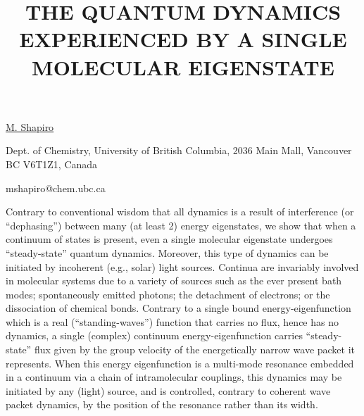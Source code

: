 \title{THE QUANTUM DYNAMICS EXPERIENCED BY A SINGLE MOLECULAR EIGENSTATE}

\underline{M. Shapiro} 

{\normalsize{\vspace{-4mm}}
Dept. of Chemistry,
University of British Columbia,
2036 Main Mall,
Vancouver BC V6T1Z1,
Canada

\email mshapiro@chem.ubc.ca}

Contrary to conventional wisdom that all dynamics is a result of interference (or ``dephasing'')
between many (at least 2) energy eigenstates, we show that when a continuum of states
is present, even a single molecular eigenstate undergoes ``steady-state'' quantum dynamics.
Moreover, this type of dynamics can be initiated by incoherent (e.g., solar) light sources.
Continua are invariably involved in molecular systems due to a variety of sources such as the
ever present bath modes; spontaneously emitted photons; the detachment of electrons; or
the dissociation of chemical bonds. Contrary to a single bound energy-eigenfunction which
is a real (``standing-waves'') function that carries no flux, hence has no dynamics, a single
(complex) continuum energy-eigenfunction carries ``steady-state'' flux given by the group velocity
of the energetically narrow wave packet it represents. When this energy eigenfunction
is a multi-mode resonance embedded in a continuum via a chain of intramolecular couplings,
this dynamics may be initiated by any (light) source, and is controlled, contrary to coherent
wave packet dynamics, by the position of the resonance rather than its width.

\vspace{\baselineskip}

